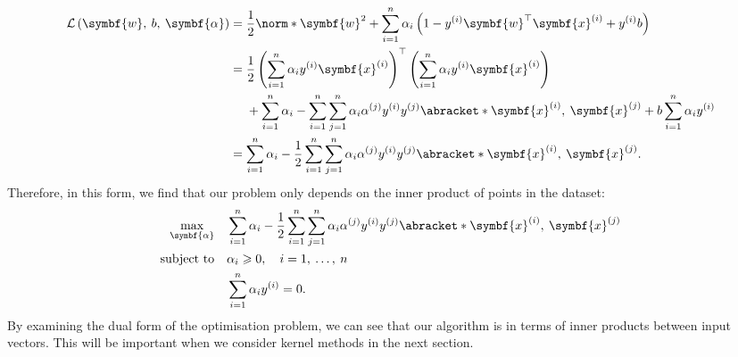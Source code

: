 \documentclass{article}
\begin{document}
\begin{align*}
    \mathcal{L}\left( \symbf{w},\: b,\: \symbf{\alpha} \right) & = \frac{1}{2}\norm*{\symbf{w}}^2 + \sum_{i = 1}^n \alpha_i \left( 1 - y^{\left( i \right)} \symbf{w}^\top \symbf{x}^{\left( i \right)} + y^{\left( i \right)} b \right)                                                      \\
                                                               & =
    \begin{aligned}[t]
         & \frac{1}{2} \left( \sum_{i = 1}^n \alpha_i y^{\left( i \right)} \symbf{x}^{\left( i \right)} \right)^\top \left( \sum_{i = 1}^n \alpha_i y^{\left( i \right)} \symbf{x}^{\left( i \right)} \right)                                                               \\
         & + \sum_{i = 1}^n \alpha_i - \sum_{i = 1}^n \sum_{j = 1}^n \alpha_i \alpha^{\left( j \right)} y^{\left( i \right)} y^{\left( j \right)} \abracket*{\symbf{x}^{\left( i \right)},\: \symbf{x}^{\left( j \right)}} + b \sum_{i = 1}^n \alpha_i y^{\left( i \right)}
    \end{aligned}
    \\
                                                               & = \sum_{i = 1}^n \alpha_i - \frac{1}{2} \sum_{i = 1}^n \sum_{j = 1}^n \alpha_i \alpha^{\left( j \right)} y^{\left( i \right)} y^{\left( j \right)} \abracket*{\symbf{x}^{\left( i \right)},\: \symbf{x}^{\left( j \right)}}.
\end{align*}
Therefore, in this form, we find that our problem only depends on the
inner product of points in the dataset:
\begin{align*}
    \max_{\symbf{\alpha}} \quad & \sum_{i = 1}^n \alpha_i - \frac{1}{2} \sum_{i = 1}^n \sum_{j = 1}^n \alpha_i \alpha^{\left( j \right)} y^{\left( i \right)} y^{\left( j \right)} \abracket*{\symbf{x}^{\left( i \right)},\: \symbf{x}^{\left( j \right)}} \\
    \text{subject to} \quad     & \alpha_i \geqslant 0, \quad i = 1,\: \dots,\: n                                                                                                                                                                           \\
                                & \sum_{i = 1}^n \alpha_i y^{\left( i \right)} = 0.
\end{align*}
By examining the dual form of the optimisation problem, we can see that
our algorithm is in terms of inner products between input vectors. This
will be important when we consider kernel methods in the next section.
\end{document}
